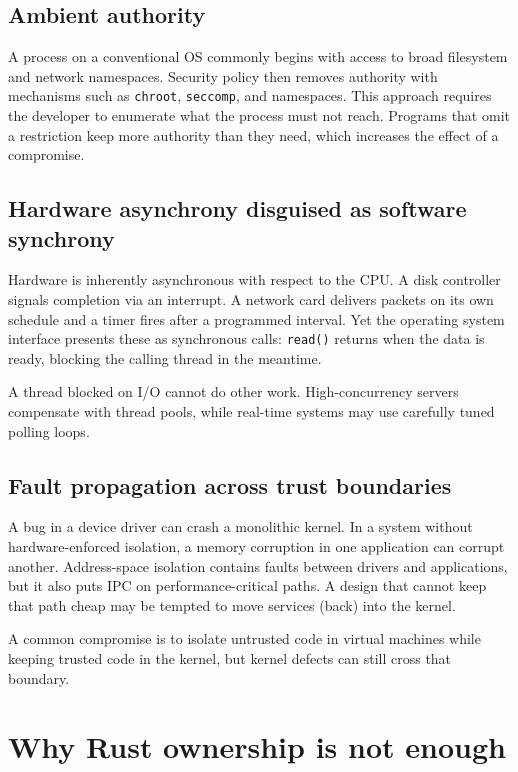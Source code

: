\subsection{Ambient authority}

A process on a conventional OS commonly begins with access to broad filesystem
and network namespaces. Security policy then removes authority with mechanisms
such as \texttt{chroot}, \texttt{seccomp}, and namespaces. This approach requires
the developer to enumerate what the process must not reach. Programs that omit
a restriction keep more authority than they need, which increases the effect
of a compromise.

\subsection{Hardware asynchrony disguised as software synchrony}

Hardware is inherently asynchronous with respect to the CPU. A disk controller
signals completion via an interrupt. A network card delivers packets on its own
schedule and a timer fires after a programmed interval. Yet the operating system
interface presents these as synchronous calls: \texttt{read()} returns when the
data is ready, blocking the calling thread in the meantime.

A thread blocked on I/O cannot do other work. High-concurrency servers compensate
with thread pools, while real-time systems may use carefully tuned polling loops.

\subsection{Fault propagation across trust boundaries}

A bug in a device driver can crash a monolithic kernel. In a system without
hardware-enforced isolation, a memory corruption in one application can corrupt
another. Address-space isolation contains faults between drivers and applications,
but it also puts IPC on performance-critical paths. A design that cannot keep that
path cheap may be tempted to move services (back) into the kernel.

A common compromise is to isolate untrusted code in virtual machines while
keeping trusted code in the kernel, but kernel defects can still cross that
boundary.

\section{Why Rust ownership is not enough}


